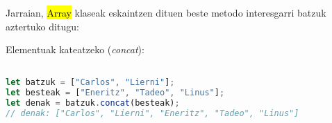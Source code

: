 % 
% 
% 
% 
% 
% 
% 

Jarraian, \hl{Array} klaseak eskaintzen dituen beste metodo interesgarri batzuk aztertuko ditugu:



\vspace{5mm} %
 Elementuak kateatzeko (\textit{concat}):

\begin{minipage}{\linewidth}
\begin{lstlisting}[language=JavaScript]

let batzuk = ["Carlos", "Lierni"];
let besteak = ["Eneritz", "Tadeo", "Linus"];
let denak = batzuk.concat(besteak);
// denak: ["Carlos", "Lierni", "Eneritz", "Tadeo", "Linus"]
\end{lstlisting}
\end{minipage}


